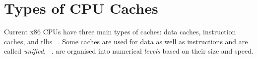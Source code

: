\section{Types of CPU Caches}
Current x86 CPUs  have three main types of caches:
data caches, instruction caches, and \glspl{tlb}%
~\cite[\href{https://youtu.be/WDIkqP4JbkE?t=11m07s}{11:07}]{scott-meyers-talk}.
Some caches are used for data as well as instructions and are called \emph{unified}.%
~\cite[20]{drepper2007}.
 are organised into numerical \emph{levels}
based on their size and speed.



